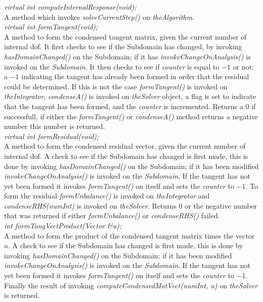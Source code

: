 {\em     virtual int  computeInternalResponse(void);}\\
A method which invokes {\em solveCurrentStep()} on {\em theAlgorithm}.  \\

{\em     virtual int  formTangent(void);}\\
A method to form the condensed tangent matrix, given the current
number of internal dof. It first checks to see if the Subdomain has
changed, by  invoking {\em hasDomainChanged()} on the Subdomain; if it
has {\em invokeChangeOnAnalysis()} is invoked on the {\em
Subdomain}. It then checks to see if {\em counter} is equal to $-1$ or
not; a $-1$ indicating the tangent has already been formed in order
that the residual could be determined. If this is not the case {\em
formTangent()} is invoked on {\em theIntegrator}, {\em condenseA()} is
invoked on {\em theSolver} object, a flag is set to indicate that the
tangent has been formed, and the {\em counter} is incremented. Returns
a $0$ if successfull, if either the {\em formTangent()} or {\em
condenseA()} method returns a negative number this number is
returned. \\  

{\em     virtual int  formResidual(void);}\\
A method to form the condensed residual vector, given the current
number of internal dof. A check to see if the Subdomain has changed is first made, 
this is done by invoking {\em hasDomainChanged()} on the Subdomain; if it has 
been modified {\em invokeChangeOnAnalysis()} 
is invoked on the {\em Subdomain}. If the tangent has not yet been formed
it invokes {\em formTangent()} on itself and sets the {\em counter} to $-1$.
To form the residual {\em formUnbalance()} is invoked on {\em theIntegrator} and
{\em condenseRHS(numInt)} is invoked on {\em theSolver}. Returns $0$ or the negative
number that was returned if either {\em formUnbalance()} or {\em condenseRHS()} failed.\\

{\em int  formTangVectProduct(Vector \&u);}\\
A method to form the product of the condensed tangent matrix times the
vector $u$. A check to see if the Subdomain has changed is first made, 
this is done by invoking {\em hasDomainChanged()} on the Subdomain; if it has 
been modified {\em invokeChangeOnAnalysis()} 
is invoked on the {\em Subdomain}. If the tangent has not yet been formed
it invokes {\em formTangent()} on itself and sets the {\em counter} to $-1$.
Finally the result of invoking {\em computeCondensedMatVect(numInt, u)} on {\em
theSolver} is returned. \\


